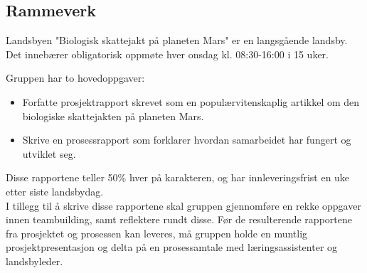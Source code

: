 \subsection{Rammeverk}

Landsbyen "Biologisk skattejakt på planeten Mars" er en langsgående landsby.
Det innebærer obligatorisk oppmøte hver onsdag kl. 08:30-16:00 i 15 uker.

Gruppen har to hovedoppgaver:
\begin{itemize}
\item Forfatte prosjektrapport skrevet som en populærvitenskaplig artikkel om den biologiske skattejakten på planeten Mars.
\item Skrive en prosessrapport som forklarer hvordan samarbeidet har fungert og utviklet seg.
\end{itemize}
Disse rapportene teller 50\% hver på karakteren, og har innleveringsfrist en uke etter siste landsbydag.
\\
I tillegg til å skrive disse rapportene skal gruppen gjennomføre en rekke oppgaver innen teambuilding, samt reflektere rundt disse.
Før de resulterende rapportene fra prosjektet og prosessen kan leveres, må gruppen holde en muntlig prosjektpresentasjon og delta på en prosessamtale med læringsassistenter og landsbyleder.